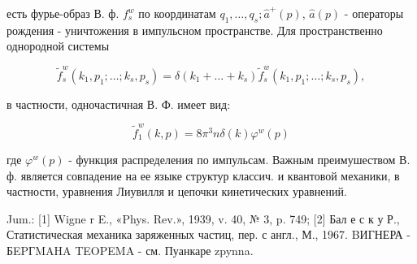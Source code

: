 \documentclass[10pt]{article}
\begin{document}
есть фурье-образ В. ф. $f_{s}^{w}$ по координатам $q_{1}, \ldots, q_{s} ; \hat{a}^{+}(p)$, $\hat{a}(p)$ - операторы рождения - уничтожения в импульсном пространстве. Для пространственно однородной системы



\[

\tilde{f}_{s}^{w}\left(k_{1}, p_{1} ; \ldots ; k_{s}, p_{s}\right)=\delta\left(k_{1}+\ldots+k_{s}\right) \tilde{f}_{s}^{w}\left(k_{1}, p_{1} ; \ldots ; k_{s}, p_{s}\right),

\]



в частности, одночастичная В. Ф. имеет вид:



\[

\tilde{f}_{1}^{w}(k, p)=8 \pi^{3} n \delta(k) \varphi^{w}(p)

\]



где $\varphi^{w}(p)$ - функция распределения по импульсам. Важным преимушеством В. ф. является совпадение на ее языке структур классич. и квантовой механики, в частности, уравнения Лиувилля и цепочки кинетических уравнений.



Jum.: [1] Wigne r E., «Phys. Rev.», 1939, v. 40, № 3, p. 749; [2] Бал е с к у Р., Статистическая механика заряженных частиц, пер. с англ., М., 1967. BИГНЕРА - БEPГMAHA TEOPEMA - см. Пуанкаре zpynna.
\end{document}
